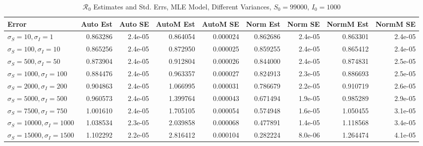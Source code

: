 \documentclass[12pt]{article}
\newcommand{\rr}{\ensuremath{\mathcal{R}_0}}
\begin{document}
\begin{table}[H]
	
	\caption{$\rr$ Estimates and Std. Errs, MLE Model, 
		Different Variances, $S_0 = 99000$, $I_0 = 1000$}
	\begin{footnotesize}
		\hskip -1.7cm
	\begin{tabular}{l|r|r|r|r|r|r|r|r}
		\hline
		Error & Auto Est & Auto SE & AutoM Est & AutoM SE & Norm Est & Norm SE & NormM Est & NormM SE\\
		\hline
		$\sigma_S = 10, \sigma_I = 1$ & 0.863286 & 2.4e-05 & 0.864054 & 0.000024 & 0.862686 & 2.4e-05 & 0.863301 & 2.4e-05\\
		\hline
		$\sigma_S = 100, \sigma_I = 10$ & 0.865256 & 2.4e-05 & 0.872950 & 0.000025 & 0.859255 & 2.4e-05 & 0.865412 & 2.4e-05\\
		\hline
		$\sigma_S = 500, \sigma_I = 50$ & 0.873904 & 2.4e-05 & 0.912804 & 0.000026 & 0.844000 & 2.4e-05 & 0.874831 & 2.5e-05\\
		\hline
		$\sigma_S = 1000, \sigma_I = 100$ & 0.884476 & 2.4e-05 & 0.963357 & 0.000027 & 0.824913 & 2.3e-05 & 0.886693 & 2.5e-05\\
		\hline
		$\sigma_S = 2000, \sigma_I = 200$ & 0.904863 & 2.4e-05 & 1.066995 & 0.000031 & 0.786679 & 2.2e-05 & 0.910719 & 2.6e-05\\
		\hline
		$\sigma_S = 5000, \sigma_I = 500$ & 0.960573 & 2.4e-05 & 1.399764 & 0.000043 & 0.671494 & 1.9e-05 & 0.985289 & 2.9e-05\\
		\hline
		$\sigma_S = 7500, \sigma_I = 750$ & 1.001610 & 2.4e-05 & 1.705105 & 0.000054 & 0.574948 & 1.6e-05 & 1.050455 & 3.1e-05\\
		\hline
		$\sigma_S = 10000, \sigma_I = 1000$ & 1.038534 & 2.3e-05 & 2.039858 & 0.000068 & 0.477891 & 1.4e-05 & 1.118568 & 3.4e-05\\
		\hline
		$\sigma_S = 15000, \sigma_I = 1500$ & 1.102292 & 2.2e-05 & 2.816412 & 0.000104 & 0.282224 & 8.0e-06 & 1.264474 & 4.1e-05\\
		\hline
	\end{tabular}
\end{footnotesize}
\end{table}
\end{document}
